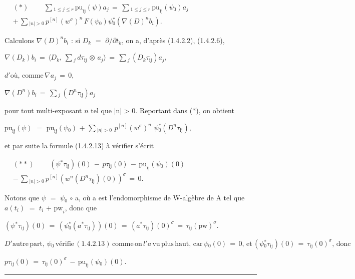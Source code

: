 \documentclass[9pt]{article}
\newcommand{\CanonText}[1]{\par{\fontsize{8.0}{9.35}\selectfont\RaggedRight #1\par}\vspace{2.2pt}}
\newcommand{\CanonDisplay}[1]{\par\vspace{1.2pt}\begin{center}{\fontsize{7.2}{8.4}\selectfont\(\displaystyle #1\)}\end{center}\vspace{1.2pt}}
\newenvironment{CanonMathBlock}{\par\vspace{1.2pt}\begin{center}\fontsize{6.8}{8.0}\selectfont\(\displaystyle}{\)\end{center}\vspace{1.2pt}}
\begin{document}
\begin{minipage}[t][\dimexpr\textheight-5pt\relax][t]{\textwidth}
\begin{CanonMathBlock}
\begin{aligned}
& (*)\qquad\,\sum{}_{1\leq{}j\leq{}r}\,\text{pu}_{\mathrm{ij}}(\psi{})a_{j}\,=\,\sum{}_{1\leq{}j\leq{}r}\,\text{pu}_{\mathrm{ij}}(\psi{}_{0})a_{j}\\
& +\,\sum{}_{|n|>0}\,p^{[n]}(w^\sigma{})^{n}\,F(\psi{}_{0})\psi{}_{0}^{*}(\nabla{}(D)^{n}b_{i}).
\end{aligned}
\end{CanonMathBlock}
\CanonText{Calculons \(\nabla{}(D)^{n}b_{i}\) : si \(D_{k}\) \(=\) \(\partial{}/\partial{}t_{k}\), on a, d'après (1.4.2.2), (1.4.2.6),}
\CanonDisplay{\nabla{}(D_{k})b_{i}\,=\,\langle{}D_{k},\,\sum{}_{j}\,d\tau{}_{\mathrm{ij}}\,\otimes{}\,a_{j}\rangle{}\,=\,\sum{}_{j}\,(D_{k}\tau{}_{\mathrm{ij}})a_{j},}
\CanonDisplay{d'\text{où},\,\text{comme}\,\nabla{}a_{j}\,=\,0,}
\CanonDisplay{\nabla{}(D^{n})b_{i}\,=\,\sum{}_{j}\,(D^{n}\tau{}_{\mathrm{ij}})a_{j}}
\CanonText{pour tout multi-exposant \(n\) tel que |n| > 0. Reportant dans (*), on obtient}
\CanonText{\(\text{pu}_{\mathrm{ij}}(\psi{})\) \(=\) \(\text{pu}_{\mathrm{ij}}(\psi{}_{0})\) + \(\sum{}_{|n|>0}\) \(p^{[n]}(w^\sigma{})^{n}\) \(\psi{}_{0}^{*}(D^{n}\tau{}_{\mathrm{ij}})\),}
\CanonText{et par suite la formule (1.4.2.13) à vérifier s'écrit}
\begin{CanonMathBlock}
\begin{aligned}
& (**)\qquad\,(\psi{}^{*}\tau{}_{\mathrm{ij}})(0)\,-\,p\tau{}_{\mathrm{ij}}(0)\,-\,\text{pu}_{\mathrm{ij}}(\psi{}_{0})(0)\\
& -\,\sum{}_{|n|>0}\,p^{[n]}(w^{n}(D^{n}\tau{}_{\mathrm{ij}})(0))^\sigma{}\,=\,0.
\end{aligned}
\end{CanonMathBlock}
\CanonText{Notons que \(\psi{}\) \(=\) \(\psi{}_{0}\) \(\circ{}\) a, où a est l'endomorphisme de W-algèbre de A tel que \(a(t_{i})\) \(=\) \(t_{i}\) + \(\text{pw}_{i}\), donc que}
\CanonDisplay{(\psi{}^{*}\tau{}_{\mathrm{ij}})(0)\,=\,(\psi{}_{0}^{*}(a^{*}\tau{}_{\mathrm{ij}}))(0)\,=\,(a^{*}\tau{}_{\mathrm{ij}})(0)^\sigma{}\,=\,\tau{}_{\mathrm{ij}}(\text{pw})^\sigma{}.}
\CanonDisplay{D'\text{autre}\,\text{part},\,\psi{}_{0}\,\text{vérifie}\,(1.4.2.13)\,\text{comme}\,\text{on}\,l'a\,\text{vu}\,\text{plus}\,\text{haut},\,\text{car}\,\psi{}_{0}(0)\,=\,0,\,\mathrm{et}\,(\psi{}_{0}^{*}\tau{}_{\mathrm{ij}})(0)\,=\,\tau{}_{\mathrm{ij}}(0)^\sigma{},\,\text{donc}}
\CanonDisplay{p\tau{}_{\mathrm{ij}}(0)\,=\,\tau{}_{\mathrm{ij}}(0)^\sigma{}\,-\,\text{pu}_{\mathrm{ij}}(\psi{}_{0})(0).}
\vfill
{\color{Accent}\hrule height 0.35pt}\vspace{3pt}
\end{minipage}
\end{document}

